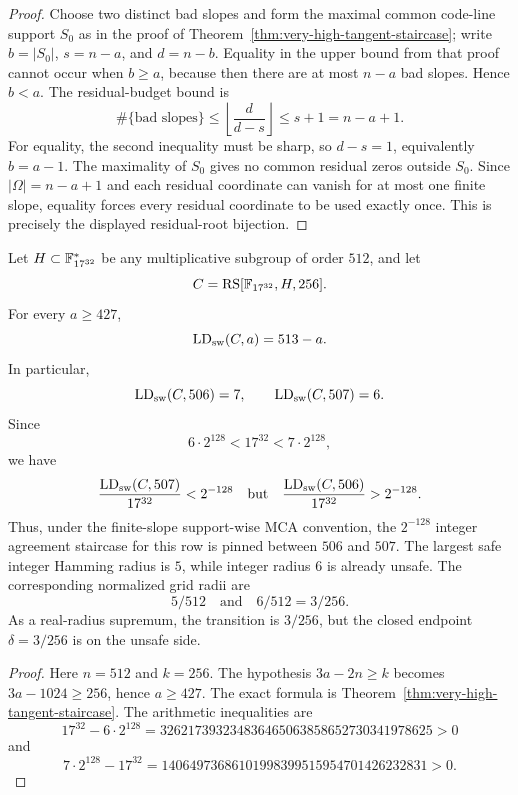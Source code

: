 \begin{proof}
Choose two distinct bad slopes and form the maximal common code-line support
\(S_0\) as in the proof of Theorem~\ref{thm:very-high-tangent-staircase}; write
\(b=|S_0|\), \(s=n-a\), and \(d=n-b\).  Equality in the upper bound from that
proof cannot occur when \(b\ge a\), because then there are at most \(n-a\) bad
slopes.  Hence \(b<a\).  The residual-budget bound is
\[
  \#\{\text{bad slopes}\}
  \le
  \left\lfloor\frac d{d-s}\right\rfloor
  \le s+1=n-a+1.
\]
For equality, the second inequality must be sharp, so \(d-s=1\), equivalently
\(b=a-1\).  The maximality of \(S_0\) gives no common residual zeros outside
\(S_0\).  Since \(|\Omega|=n-a+1\) and each residual coordinate can vanish for
at most one finite slope, equality forces every residual coordinate to be used
exactly once.  This is precisely the displayed residual-root bijection.
\end{proof}

\begin{corollary}
\label{cor:f17-32-exact-tangent-gate}
Let \(H\subset \mathbb F_{17^{32}}^*\) be any multiplicative subgroup of order
\(512\), and let
\[
  C=\operatorname{RS}[\mathbb F_{17^{32}},H,256].
\]
For every \(a\ge427\),
\[
  \operatorname{LD}_{\rm sw}(C,a)=513-a.
\]
In particular,
\[
  \operatorname{LD}_{\rm sw}(C,506)=7,
  \qquad
  \operatorname{LD}_{\rm sw}(C,507)=6.
\]
Since
\[
  6\cdot2^{128}<17^{32}<7\cdot2^{128},
\]
we have
\[
  \frac{\operatorname{LD}_{\rm sw}(C,507)}{17^{32}}<2^{-128}
  \quad\text{but}\quad
  \frac{\operatorname{LD}_{\rm sw}(C,506)}{17^{32}}>2^{-128}.
\]
Thus, under the finite-slope support-wise MCA convention, the \(2^{-128}\)
integer agreement staircase for this row is pinned between \(506\) and \(507\).
The largest safe integer Hamming radius is \(5\), while integer radius \(6\) is
already unsafe.  The corresponding normalized grid radii are
\[
  5/512
  \quad\text{and}\quad
  6/512=3/256.
\]
As a real-radius supremum, the transition is \(3/256\), but the closed endpoint
\(\delta=3/256\) is on the unsafe side.
\end{corollary}

\begin{proof}
Here \(n=512\) and \(k=256\).  The hypothesis
\(3a-2n\ge k\) becomes \(3a-1024\ge256\), hence \(a\ge427\).  The exact formula
is Theorem~\ref{thm:very-high-tangent-staircase}.  The arithmetic inequalities
are
\[
  17^{32}-6\cdot2^{128}
  =326217393234836465063858652730341978625>0
\]
and
\[
  7\cdot2^{128}-17^{32}
  =14064973686101998399515954701426232831>0 .
\]
\end{proof}

